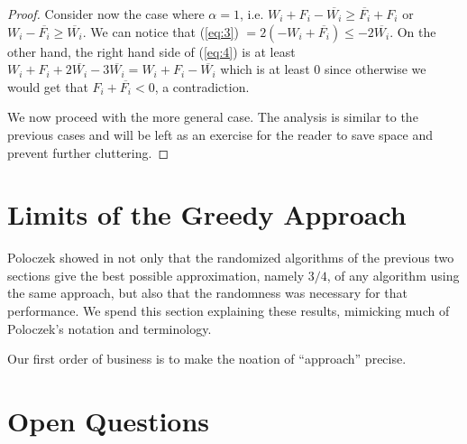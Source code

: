\documentclass[11pt,letter]{article}
\begin{document}
\begin{proof}
Consider now the case where $\alpha = 1$, i.e. $W_i + F_i -\overline{W_i} \geq \overline{F_i} + F_i$ or $W_i - \overline{F_i} \geq \overline{W_i}$.
We can notice that (\ref{eq:3}) $= 2(-W_i + \overline{F_i}) \leq -2\overline{W_i}$. On the other hand, the right hand side of  (\ref{eq:4})
is at least $W_i + F_i + 2\overline{W_i} -3\overline{W_i} = W_i + F_i - \overline{W_i}$ which is at least $0$ since otherwise we would get
that $F_i + \overline{F_i} < 0$, a contradiction.

We now proceed with the more general case. The analysis is similar to the previous cases and will be left as an exercise
for the reader to save space and prevent further cluttering.

\end{proof}


\section{Limits of the Greedy Approach}\label{S:limits}

Poloczek showed in \cite{DBLP:conf/esa/Poloczek11} not only that
the randomized algorithms of the previous two sections
give the best possible approximation, namely $3/4$,
of any algorithm using the same approach,
but also that the randomness was necessary for that performance.
We spend this section explaining these results,
mimicking much of Poloczek's notation and terminology.

Our first order of business is to make the noation of ``approach'' precise.



\section{Open Questions}\label{S:open}




\end{document}

